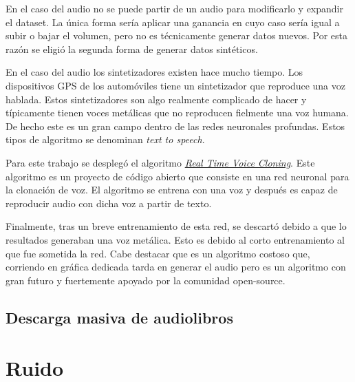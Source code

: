 En el caso del audio no se puede partir de un audio para modificarlo y expandir el \gls{dataset}. La única forma sería aplicar una ganancia en cuyo caso sería igual a subir o bajar el volumen, pero no es técnicamente generar datos nuevos. Por esta razón se eligió la segunda forma de generar datos sintéticos.

En el caso del audio los sintetizadores existen hace mucho tiempo. Los dispositivos \gls{GPS} de los automóviles tiene un sintetizador que reproduce una voz hablada. Estos sintetizadores son algo realmente complicado de hacer y típicamente tienen voces metálicas que no reproducen fielmente una voz humana. De hecho este es un gran campo dentro de las redes neuronales profundas. Estos tipos de algoritmo se denominan \textit{text to speech}.

Para este trabajo se desplegó el algoritmo \textit{\href{https://github.com/CorentinJ/Real-Time-Voice-Cloning}{Real Time Voice Cloning}}. Este algoritmo es un proyecto de código abierto que consiste en una red neuronal para la clonación de voz\cite{transfer_learning}. El algoritmo se entrena con una voz y después es capaz de reproducir audio con dicha voz a partir de texto.

Finalmente, tras un breve entrenamiento de esta red, se descartó debido a que lo resultados generaban una voz metálica. Esto es debido al corto entrenamiento al que fue sometida la red. Cabe destacar que es un algoritmo costoso que, corriendo en gráfica dedicada tarda en generar el audio pero es un algoritmo con gran futuro y fuertemente apoyado por la comunidad open-source.

\subsection{Descarga masiva de audiolibros}

\section{Ruido}
